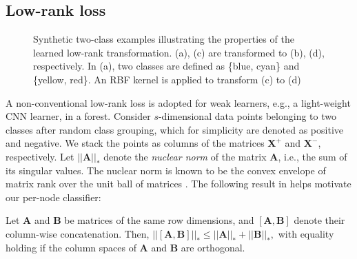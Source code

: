 \documentclass[runningheads]{llncs}
\begin{document}
\subsection{Low-rank loss}
\label{sec:trans}

\begin{figure*}[t]
  \centering
  \caption{Synthetic two-class examples illustrating the properties of the
    learned low-rank transformation. (a), (c) are transformed to (b), (d),
    respectively. In (a), two classes are defined as \{blue, cyan\} and
    \{yellow, red\}. An RBF kernel is applied to transform (c) to (d)}
  \label{fig:toyexample}
\end{figure*}


A  non-conventional low-rank loss is adopted
for weak learners, e.g., a light-weight CNN learner, in a forest.  Consider $s$-dimensional data points belonging
to two classes after random class grouping, which for simplicity are denoted as
positive and negative. We stack the points as columns of the matrices
$\mathbf{X}^+$ and $\mathbf{X}^-$, respectively.  Let $||\mathbf{A}||_*$ denote
the \emph{nuclear norm} of the matrix $\mathbf{A}$, i.e., the sum of its
singular values. The nuclear norm is known to be the convex envelope of matrix
rank over the unit ball of matrices \cite{rank-min}. The following result in
\cite{lowrankT} helps motivate our per-node classifier:


\begin{lemma}  \label{nuclear_ineq}
Let $\mathbf{A}$ and $\mathbf{B}$ be matrices of the same row dimensions, and
$\mathbf{[A,B]}$ denote their column-wise concatenation. Then, $
||\mathbf{[\mathbf{A},\mathbf{B}]}||_* \le ||\mathbf{A}||_* + ||\mathbf{B}||_*,
$ with equality holding if the column spaces of $\mathbf{A}$ and $\mathbf{B}$
are orthogonal.
\end{lemma}
\end{document}
